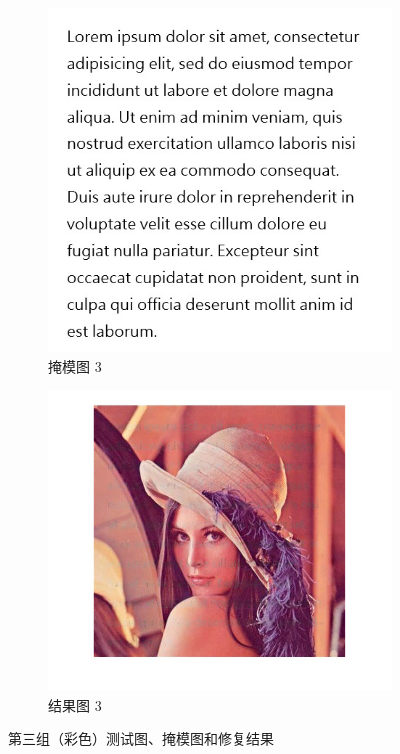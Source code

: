 \documentclass[UTF8]{ctexart}
\begin{document}
\begin{figure}[H]
\begin{subfigure}[b]{0.3\textwidth}
        \includegraphics[width=\textwidth]{mask.jpg} %
        \caption{掩模图 3}
        \label{fig:mask2}
    \end{subfigure}
    \hfill
    \begin{subfigure}[b]{0.3\textwidth}
        \includegraphics[width=\textwidth]{res3.jpg} %
        \caption{结果图 3}
        \label{fig:res2}
    \end{subfigure}
    \caption{第三组（彩色）测试图、掩模图和修复结果}
    \label{fig:group2}
\end{figure}
\end{document}
